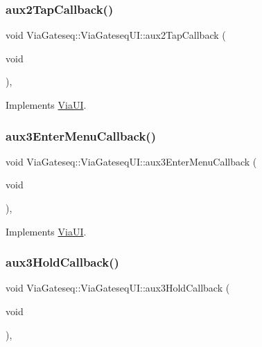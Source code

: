 \subsubsection{\texorpdfstring{aux2\+Tap\+Callback()}{aux2TapCallback()}}
{\footnotesize\ttfamily void Via\+Gateseq\+::\+Via\+Gateseq\+U\+I\+::aux2\+Tap\+Callback (\begin{DoxyParamCaption}\item[{void}]{ }\end{DoxyParamCaption})\hspace{0.3cm}{\ttfamily [override]}, {\ttfamily [virtual]}}



Implements \mbox{\hyperlink{class_via_u_i_ae5e009dc22002f62e6bff8dd76d2f745}{Via\+UI}}.

\mbox{\label{class_via_gateseq_1_1_via_gateseq_u_i_a8235806bb28a40062b89b1cb9c83e3b0}} 
\subsubsection{\texorpdfstring{aux3\+Enter\+Menu\+Callback()}{aux3EnterMenuCallback()}}
{\footnotesize\ttfamily void Via\+Gateseq\+::\+Via\+Gateseq\+U\+I\+::aux3\+Enter\+Menu\+Callback (\begin{DoxyParamCaption}\item[{void}]{ }\end{DoxyParamCaption})\hspace{0.3cm}{\ttfamily [override]}, {\ttfamily [virtual]}}



Implements \mbox{\hyperlink{class_via_u_i_aa62c9f8dc58d37fc2a3abc7bce1cd16e}{Via\+UI}}.

\mbox{\label{class_via_gateseq_1_1_via_gateseq_u_i_a5b18aa40706a39ed8878143d6911bc78}} 
\subsubsection{\texorpdfstring{aux3\+Hold\+Callback()}{aux3HoldCallback()}}
{\footnotesize\ttfamily void Via\+Gateseq\+::\+Via\+Gateseq\+U\+I\+::aux3\+Hold\+Callback (\begin{DoxyParamCaption}\item[{void}]{ }\end{DoxyParamCaption})\hspace{0.3cm}{\ttfamily [override]}, {\ttfamily [virtual]}}



